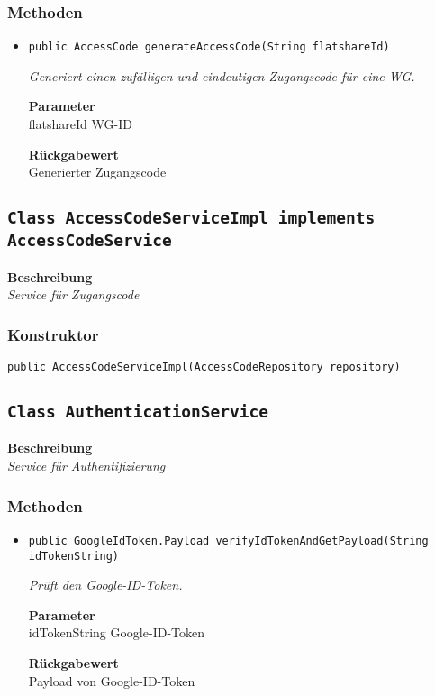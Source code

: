     \subsubsection*{Methoden}
    \begin{itemize}
    	\item{\texttt{public AccessCode generateAccessCode(String flatshareId)}}
    	
    	\textit{Generiert einen zufälligen und eindeutigen Zugangscode für eine WG.}
    	
    	\textbf{Parameter} \\
    	flatshareId WG-ID
    	
    	\textbf{Rückgabewert} \\
    	Generierter Zugangscode
    \end{itemize}
    \subsection{\texttt{Class AccessCodeServiceImpl implements AccessCodeService}}
    \textbf{Beschreibung} \\
    \textit{Service für Zugangscode}
    \subsubsection*{Konstruktor}
    \texttt{public AccessCodeServiceImpl(AccessCodeRepository repository)}
    \subsection{\texttt{Class AuthenticationService}}
    \textbf{Beschreibung} \\
    \textit{Service für Authentifizierung}
    \subsubsection*{Methoden}
    \begin{itemize}
    	\item{\texttt{public GoogleIdToken.Payload verifyIdTokenAndGetPayload(String idTokenString)}}
    	
    	\textit{Prüft den Google-ID-Token.}
    	
    	\textbf{Parameter} \\
    	idTokenString Google-ID-Token
    	
    	\textbf{Rückgabewert} \\
    	Payload von Google-ID-Token
    \end{itemize}
